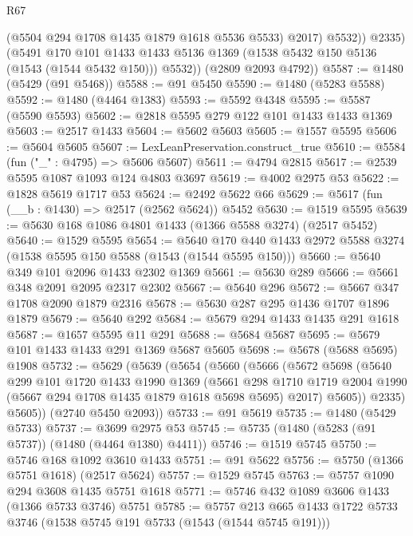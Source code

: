 \begin{lexlean}{R67}
\begin{coremodule}
                (@5504 @294 @1708 @1435 @1879 @1618 @5536 @5533)
                @2017)
              @5532))
          @2335)
        (@5491
          @170
          @101
          @1433
          @1433
          @5136
          @1369
          (@1538 @5432 @150 @5136 (@1543 (@1544 @5432 @150)))
          @5532))
      (@2809 @2093 @4792))
@5587 := @1480 (@5429 (@91 @5468))
@5588 := @91 @5450
@5590 := @1480 (@5283 @5588)
@5592 := @1480 (@4464 @1383)
@5593 := @5592 @4348
@5595 := @5587 (@5590 @5593)
@5602 := @2818 @5595 @279 @122 @101 @1433 @1433 @1369
@5603 := @2517 @1433
@5604 := @5602 @5603
@5605 := @1557 @5595
@5606 := @5604 @5605
@5607 := LexLeanPreservation.construct_true
@5610 := @5584 (fun ("_" : @4795) => @5606 @5607)
@5611 := @4794 @2815
@5617 := @2539 @5595 @1087 @1093 @124 @4803 @3697
@5619 := @4002 @2975 @53
@5622 := @1828 @5619 @1717 @53
@5624 := @2492 @5622 @66
@5629 := @5617 (fun (__b : @1430) => @2517 (@2562 @5624)) @5452
@5630 := @1519 @5595
@5639 := @5630 @168 @1086 @4801 @1433 (@1366 @5588 @3274) (@2517 @5452)
@5640 := @1529 @5595
@5654 := @5640 @170 @440 @1433 @2972 @5588 @3274 (@1538 @5595 @150 @5588 (@1543 (@1544 @5595 @150)))
@5660 := @5640 @349 @101 @2096 @1433 @2302 @1369
@5661 := @5630 @289
@5666 := @5661 @348 @2091 @2095 @2317 @2302
@5667 := @5640 @296
@5672 := @5667 @347 @1708 @2090 @1879 @2316
@5678 := @5630 @287 @295 @1436 @1707 @1896 @1879
@5679 := @5640 @292
@5684 := @5679 @294 @1433 @1435 @291 @1618
@5687 := @1657 @5595 @11 @291
@5688 := @5684 @5687
@5695 := @5679 @101 @1433 @1433 @291 @1369 @5687 @5605
@5698 := @5678 (@5688 @5695) @1908
@5732 := @5629
    (@5639
      (@5654
        (@5660
          (@5666
            (@5672
              @5698
              (@5640
                @299
                @101
                @1720
                @1433
                @1990
                @1369
                (@5661
                  @298
                  @1710
                  @1719
                  @2004
                  @1990
                  (@5667 @294 @1708 @1435 @1879 @1618 @5698 @5695)
                  @2017)
                @5605))
            @2335)
          @5605))
      (@2740 @5450 @2093))
@5733 := @91 @5619
@5735 := @1480 (@5429 @5733)
@5737 := @3699 @2975 @53
@5745 := @5735 (@1480 (@5283 (@91 @5737)) (@1480 (@4464 @1380) @4411))
@5746 := @1519 @5745
@5750 := @5746 @168 @1092 @3610 @1433
@5751 := @91 @5622
@5756 := @5750 (@1366 @5751 @1618) (@2517 @5624)
@5757 := @1529 @5745
@5763 := @5757 @1090 @294 @3608 @1435 @5751 @1618
@5771 := @5746 @432 @1089 @3606 @1433 (@1366 @5733 @3746) @5751
@5785 := @5757 @213 @665 @1433 @1722 @5733 @3746 (@1538 @5745 @191 @5733 (@1543 (@1544 @5745 @191)))

\end{coremodule}
\end{lexlean}
